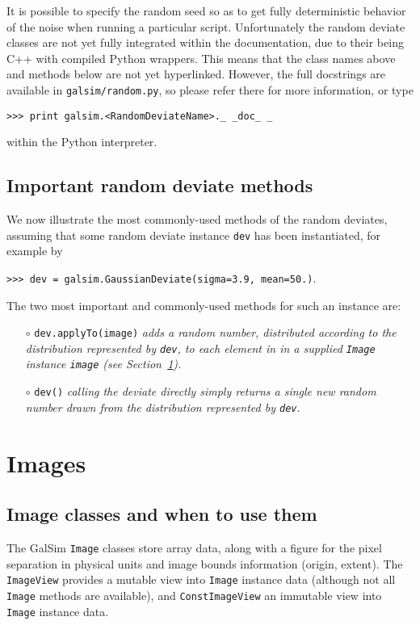 \documentclass[preprint,11pt]{aastex}
\begin{document}
It is possible to specify the random seed so as to get fully deterministic behavior of the noise
when running a particular script.  Unfortunately the random deviate classes are not yet fully integrated
within the documentation, due to their being C++ with
compiled Python wrappers.  This means that the class names above and
methods below are not yet hyperlinked.  
However, the full docstrings are available in
\texttt{galsim/random.py}, so please refer there for more information,
or type

{\tt >>> print galsim.<RandomDeviateName>.\_\,\_doc\_\,\_}

within the Python interpreter.

\subsection{Important random deviate methods}\label{sect:randommethods}
We now illustrate the most commonly-used methods of the random
deviates, assuming that some random deviate instance \texttt{dev} has
been instantiated, for example by

{\tt >>> dev = galsim.GaussianDeviate(sigma=3.9, mean=50.)}.

The two most important and commonly-used methods for such an
instance are:
\begin{itemize}

\item[$\circ$] \texttt{dev.applyTo(image)} \newline \emph{adds a random
    number,
  distributed according to the distribution represented by 
\texttt{dev}, to each element in in a supplied \texttt{Image} instance \texttt{image} (see Section~\ref{sect:image}).}

\item[$\circ$] \texttt{dev()} \newline \emph{calling the deviate
    directly simply returns a single new random
    number drawn from the distribution 
    represented by \texttt{dev}}.

\end{itemize}

\section{Images}\label{sect:image}

\subsection{Image classes and when to use them}
The GalSim \texttt{Image} classes store array data, along with a
figure for the pixel separation in physical units and image bounds
information (origin, extent).  The \texttt{ImageView} provides a
mutable view into \texttt{Image} instance data (although not all
\texttt{Image} methods are available), and
\texttt{ConstImageView} an immutable view into \texttt{Image} instance
data.
\end{document}
